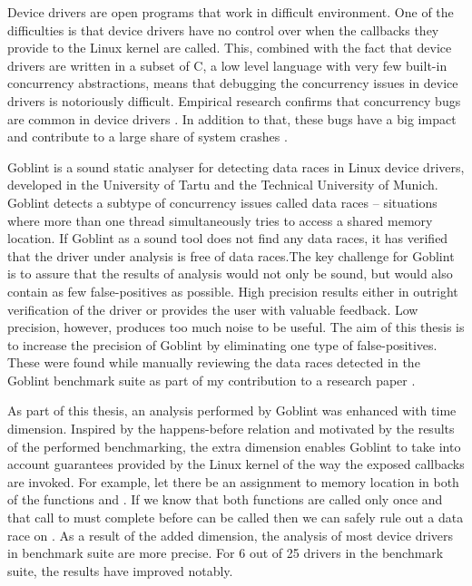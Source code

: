\documentclass[..thesis.tex]{subfiles}
\begin{document}
 


Device drivers are open programs that work in difficult environment. One of the difficulties is that device drivers have no control over when the callbacks they provide to the Linux kernel
are called. This, combined with the fact that device drivers are written in a subset of C, a low level language with very few built-in concurrency abstractions,
means that debugging the concurrency issues in device drivers is notoriously difficult. Empirical research confirms that concurrency bugs are common in
device drivers \cite{chou_empirical_2001,palix_faults_2011}.  
In addition to that, these bugs have a big impact and contribute to a large share of system crashes \cite{swift_improving_2003}. 

Goblint is a sound static analyser for detecting data races in Linux device drivers, developed in the University of Tartu and the Technical University of Munich. Goblint detects a subtype of concurrency issues called data races -- situations where more than one thread simultaneously tries to access a shared memory location.
If Goblint as a sound tool does not find any data races, it has verified that the driver under analysis is free of data races.The key challenge for Goblint is to assure that the results of analysis would not only be sound, but would also contain as few false-positives as possible. High precision results either in outright verification of the driver or provides the user with valuable feedback. Low precision, however, produces too much noise to be useful. The aim of this thesis is to increase the precision of Goblint by eliminating one type of false-positives. These were found while manually reviewing the data races detected in the Goblint benchmark suite as part of my contribution to a research paper \cite{vojdani_static_2016}.
  

As part of this thesis, an analysis performed by Goblint was enhanced with time dimension. Inspired by the happens-before relation and motivated by the results of the performed benchmarking,
the extra dimension enables Goblint to take into account guarantees provided by the Linux kernel of the way the exposed callbacks are invoked.
For example, let there be an assignment to memory location  in both of the functions  and . 
If we know that both functions are called only once and that call to  must complete before  can be called then we can safely rule out a data race on .
As a result of the added dimension, the analysis of most device drivers in benchmark suite are more precise. For 6 out of 25 drivers in the benchmark suite,
the results have improved notably.
\end{document}
